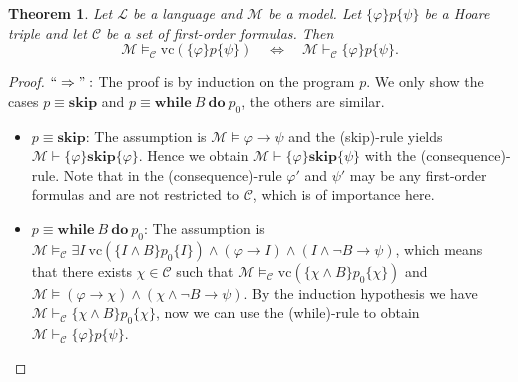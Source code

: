 \documentclass[acmsmall]{acmart}
\theoremstyle{plain}
\newtheorem{theorem}{Theorem}
\theoremstyle{definition}
\newcommand{\calL}{\mathcal{L}}
\newcommand{\calM}{\mathcal{M}}
\newcommand{\calC}{\mathcal{C}}
\newcommand{\impl}{\rightarrow} %
\newcommand{\hoare}[3]{\{#1\}#2\{#3\}}
\newcommand{\vc}{\mathrm{vc}}
\newcommand{\hskipit}{\textbf{skip}}
\newcommand{\hwhile}{\textbf{while}~}
\newcommand{\hdo}{~\textbf{do}~}
\begin{document}
%
\begin{theorem}\label{thm.hoareVcEquiv}
	Let $\calL$ be a language and $\calM$ be a model. Let $\hoare{\varphi}{p}{\psi}$ be a Hoare triple and let $\calC$ be a set of first-order formulas. %
	Then
	\[
		\calM \models_{\calC} \vc(\hoare{\varphi}{p}{\psi})\quad \Leftrightarrow \quad \calM \vdash_{\calC} \hoare{\varphi}{p}{\psi}.
	\]
\end{theorem}
\begin{proof}
	$``\Rightarrow":$ The proof is by induction on the program $p$. We only show the cases $p \equiv \hskipit$ and $p \equiv \hwhile B \hdo p_0$, the others are similar.
	\begin{itemize}
		\item $p \equiv \hskipit$: The assumption is $\calM \models \varphi \impl \psi$ and the (skip)-rule yields $\calM \vdash \hoare{\varphi}{\hskipit}{\varphi}$. Hence we obtain $\calM \vdash \hoare{\varphi}{\hskipit}{\psi}$ with the (consequence)-rule. Note that in the (consequence)-rule $\varphi'$ and $\psi'$ may be any first-order formulas and are not restricted to $\calC$, which is of importance here.
		\item $p \equiv \hwhile B \hdo p_0$: The assumption is $\calM \models_{\calC} \exists I ~\vc(\hoare{I \wedge B}{p_0}{I}) \wedge (\varphi \rightarrow I) \wedge (I \wedge \neg B \rightarrow \psi)$, which means that there exists $\chi \in \calC$ such that $\calM \models_{\calC} \vc(\hoare{\chi \wedge B}{p_0}{\chi})$ and $\calM \models (\varphi \rightarrow \chi) \wedge (\chi \wedge \neg B \rightarrow \psi)$. By the induction hypothesis we have $\calM \vdash_{\calC} \hoare{\chi \wedge B}{p_0}{\chi}$, now we can use the (while)-rule to obtain $\calM \vdash_{\calC} \hoare{\varphi}{p}{\psi}$.
	\end{itemize}



\end{proof}
\end{document}
